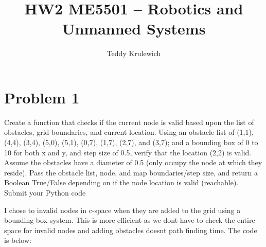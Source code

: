\documentclass{article}
\author{Teddy Krulewich}
\title{\vspace{-4em}HW2 ME5501 – Robotics and Unmanned Systems}
\begin{document}
\maketitle


\section*{Problem 1}

Create a function that checks if the current node is valid based upon the list of obstacles, grid 
boundaries, and current location. 
Using an obstacle list of (1,1), (4,4), (3,4), (5,0), (5,1), (0,7), (1,7), (2,7), and (3,7); and a bounding box 
of 0 to 10 for both x and y, and step size of 0.5, verify that the location (2,2) is valid. Assume the 
obstacles have a diameter of 0.5 (only occupy the node at which they reside).
Pass the obstacle list, node, and map boundaries/step size, and return a Boolean True/False 
depending on if the node location is valid (reachable).
Submit your Python code


I chose to invalid nodes in c-space when they are added to the grid using a bounding box system.
This is more efficient as we dont have to check the entire space for invalid nodes and adding obstacles
doesnt path finding time. The code is below:
\end{document}
